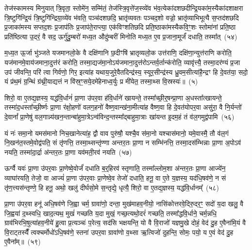 तेज॑स्कामस्य मिनुयात् त्रि॒वृता॒ स्तोमे॑न॒ सम्मि॑तं॒ तेज॑स्त्रि॒वृत्\-ते॑ज॒स्व्ये॑व भ॑व॒त्येका॑\-दशछदीन्द्रि॒यका॑म॒स्यैका॑\-दशाक्षरा त्रि॒ष्टुगि॑न्द्रि॒यं त्रि॒ष्टुगि॑न्द्रिया॒व्ये॑व भ॑वति॒ पञ्च॑दशछदि॒ भ्रातृ॑व्यवतः पञ्चद॒शो वज्रो॒ भ्रातृ॑व्याभिभूत्यै स॒प्तद॑शछदि प्र॒जाका॑मस्य सप्तद॒शः प्र॒जा\-प॑तिः प्र॒जा\-प॑ते॒राप्त्या॒ एक॑विꣳशतिछदि प्रति॒ष्ठाका॑मस्यैकवि॒ꣳ॒शः स्तोमा॑नां प्रति॒ष्ठा प्रति॑ष्ठित्या उ॒दरं॒ वै सद॒ ऊर्गु॑दु॒म्बरो॑ मध्य॒त औदु॑म्बरीं मिनोति मध्य॒त ए॒व प्र॒जाना॒मूर्जं॑ दधाति॒ तस्मा᳚त्~(५४)

म॒ध्य॒त ऊ॒र्जा भु॑ञ्जते यजमानलो॒के वै दक्षि॑णानि छ॒दीꣳषि॑ भ्रातृव्यलो॒क उत्त॑राणि॒ दक्षि॑णा॒न्युत्त॑राणि करोति॒ यज॑मानमे॒वाय॑जमाना॒दुत्त॑रं करोति॒ तस्मा॒द्यज॑मा॒नो\-ऽय॑जमाना॒दुत्त॑रो\-ऽन्तर्व॒र्तान्क॑रोति॒ व्यावृ॑त्त्यै॒ तस्मा॒दर॑ण्यं प्र॒जा उप॑ जीवन्ति॒ परि॑ त्वा गिर्वणो॒ गिर॒ इत्या॑ह यथाय॒जुरे॒वैतदिन्द्र॑स्य॒ स्यूर॒सीन्द्र॑स्य ध्रु॒वम॒सीत्या॑है॒न्द्रꣳ हि दे॒वत॑या॒ सदो॒ यं प्र॑थ॒मं ग्र॒न्थिं ग्र॑थ्नी॒याद्यत्तं न वि॑स्र॒ꣳ॒सये॒दमे॑हेनाध्व॒र्युः प्र मी॑येत॒ तस्मा॒थ्स वि॒स्रस्यः॑॥~(५)

{\anuvakamend[{अप॑हत्यै॒ तस्मा᳚त्पितृदेव॒त्य॑न्तेनै॒व नव॑छदि॒ तस्मा॒थ्सदः॒ पञ्च॑दश च}]}%

शिरो॒ वा ए॒तद्य॒ज्ञस्य॒ यद्ध॑वि॒र्धानं॑ प्रा॒णा उ॑पर॒वा ह॑वि॒र्धाने॑ खायन्ते॒ तस्मा᳚च्छी॒र्॒\mbox{}षन्प्रा॒णा अ॒धस्ता᳚त्खायन्ते॒ तस्मा॑द॒धस्ता᳚च्छी॒र्ष्णः प्रा॒णा र॑क्षो॒हणो॑ वलग॒हनो॑ वैष्ण॒वान्ख॑ना॒मीत्या॑ह वैष्ण॒वा हि दे॒वत॑योपर॒वा असु॑रा॒ वै नि॒र्यन्तो॑ दे॒वानां᳚ प्रा॒णेषु॑ वल॒गान्न्य॑खन॒न्तान्बा॑हुमा॒त्रे\-ऽन्व॑विन्द॒न्तस्मा᳚द्बाहुमा॒त्राः खा॑यन्त इ॒दम॒हं तं व॑ल॒गमुद्व॑पामि~(५६)

यं नः॑ समा॒नो यमस॑मानो निच॒खानेत्या॑ह॒ द्वौ वाव पुरु॑षौ॒ यश्चै॒व स॑मा॒नो यश्चास॑मानो॒ यमे॒वास्मै॒ तौ व॑ल॒गं नि॒खन॑त॒स्तमे॒वोद्व॑पति॒ सं तृ॑णत्ति॒ तस्मा॒थ्सन्तृ॑ण्णा अन्तर॒तः प्रा॒णा न सम्भि॑नत्ति॒ तस्मा॒दस॑म्भिन्नाः प्रा॒णा अ॒पो\-ऽव॑ नयति॒ तस्मा॑दा॒र्द्रा अ॑न्तर॒तः प्रा॒णा यव॑मती॒रव॑ नयति~(५७)

ऊर्ग्वै यवः॑ प्रा॒णा उ॑पर॒वाः प्रा॒णेष्वे॒वोर्जं॑ दधाति ब॒र्॒\mbox{}हिरव॑ स्तृणाति॒ तस्मा᳚ल्लोम॒शा अ॑न्तर॒तः प्रा॒णा आज्ये॑न॒ व्याघा॑रयति॒ तेजो॒ वा आज्यं॑ प्रा॒णा उ॑पर॒वाः प्रा॒णेष्वे॒व तेजो॑ दधाति॒ हनू॒ वा ए॒ते य॒ज्ञस्य॒ यद॑धि॒षव॑णे॒ न सं तृ॑ण॒त्त्यस॑न्तृण्णे॒ हि हनू॒ अथो॒ खलु॑ दीर्घसो॒मे स॒न्तृद्ये॒ धृत्यै॒ शिरो॒ वा ए॒तद्य॒ज्ञस्य॒ यद्ध॑वि॒र्धानम्᳚~(५८)

प्रा॒णा उ॑पर॒वा हनू॑ अधि॒षव॑णे जि॒ह्वा चर्म॒ ग्रावा॑णो॒ दन्ता॒ मुख॑माहव॒नीयो॒ नासि॑कोत्तरवे॒दिरु॒दर॒ꣳ॒ सदो॑ य॒दा खलु॒ वै जि॒ह्वया॑ द॒थ्स्वधि॒ खाद॒त्यथ॒ मुखं॑ गच्छति य॒दा मुखं॒ गच्छ॒त्यथो॒दरं॑ गच्छति॒ तस्मा᳚द्धवि॒र्धाने॒ चर्म॒न्नधि॒ ग्राव॑भिरभि॒षुत्या॑हव॒नीये॑ हु॒त्वा प्र॒त्यञ्चः॑ प॒रेत्य॒ सद॑सि भक्षयन्ति॒ यो वै वि॒राजो॑ यज्ञमु॒खे दोहं॒ वेद॑ दु॒ह ए॒वैना॑मि॒यं वै वि॒राट्तस्यैँ त्वक्चर्मोधो॑\-ऽधि॒षव॑णे॒ स्तना॑ उपर॒वा ग्रावा॑णो व॒थ्सा ऋ॒त्विजो॑ दुहन्ति॒ सोमः॒ पयो॒ य ए॒वं वेद॑ दु॒ह ए॒वैना᳚म्॥~(५९)

